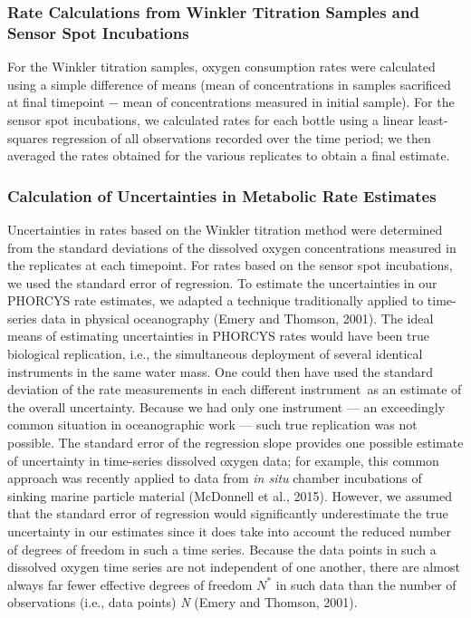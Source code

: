 \subsubsection{Rate Calculations from Winkler Titration Samples and Sensor Spot Incubations}
For the Winkler titration samples, oxygen consumption rates were calculated using a simple difference of means (mean of concentrations in samples sacrificed at final timepoint $-$ mean of concentrations measured in initial sample). For the sensor spot incubations, we calculated rates for each bottle using a linear least-squares regression of all observations recorded over the time period; we then averaged the rates obtained for the various replicates to obtain a final estimate.
\subsubsection{Calculation of Uncertainties in Metabolic Rate Estimates}
\label{ssec:Calculation of Uncertainties in Metabolic Rate Estimates}		
Uncertainties in rates based on the Winkler titration method were determined from the standard deviations of the dissolved oxygen concentrations measured in the replicates at each timepoint. For rates based on the sensor spot incubations, we used the standard error of regression. To estimate the uncertainties in our PHORCYS rate estimates, we adapted a technique traditionally applied to time-series data in physical oceanography (Emery and Thomson, 2001). The ideal means of estimating uncertainties in PHORCYS rates would have been true biological replication, i.e., the simultaneous deployment of several identical instruments in the same water mass. One could then have used the standard deviation of the rate measurements in each different instrument~as an estimate of the overall uncertainty. Because we had only one instrument --- an exceedingly common situation in oceanographic work --- such true replication was not possible. The standard error of the regression slope provides one possible estimate of uncertainty in time-series dissolved oxygen data; for example, this common approach was recently applied to data from \emph{in situ} chamber incubations of sinking marine particle material (McDonnell et al., 2015). However, we assumed that the standard error of regression would significantly underestimate the true uncertainty in our estimates since it does take into account the reduced number of degrees of freedom in such a time series. Because the data points in such a dissolved oxygen time series are not independent of one another, there are almost always far fewer effective degrees of freedom $N^*$ in such data than the number of observations (i.e., data points) \emph{N} (Emery and Thomson, 2001).

